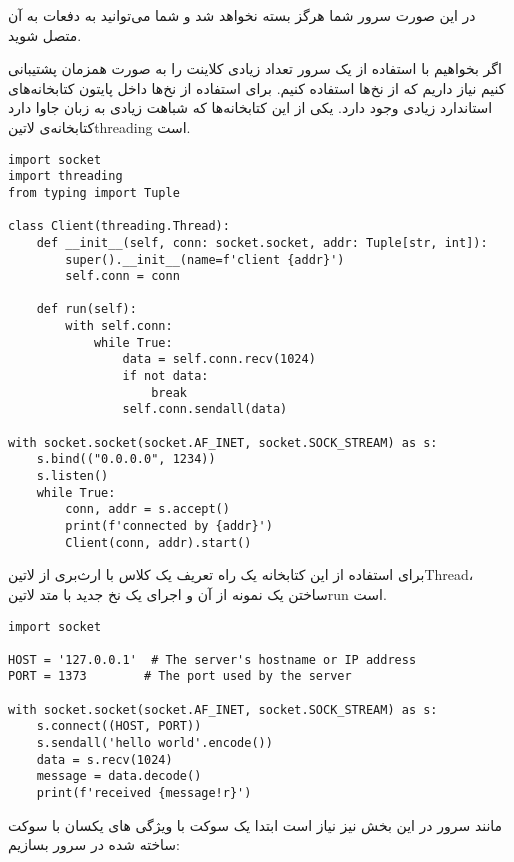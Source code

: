 \documentclass[]{article}
\begin{document}
  در این صورت سرور شما هرگز بسته نخواهد شد و شما می‌توانید به دفعات به آن متصل شوید.


  اگر بخواهیم با استفاده از یک سرور تعداد زیادی کلاینت را به صورت همزمان پشتیبانی کنیم نیاز داریم که از نخ‌ها استفاده کنیم.
  برای استفاده از نخ‌ها داخل پایتون کتابخانه‌های استاندارد زیادی وجود دارد. یکی از این کتابخانه‌ها که شباهت زیادی به زبان جاوا دارد
  کتابخانه‌ی ‌لاتین{threading} است.

  \begin{latin}
  \begin{verbatim}
import socket
import threading
from typing import Tuple

class Client(threading.Thread):
    def __init__(self, conn: socket.socket, addr: Tuple[str, int]):
        super().__init__(name=f'client {addr}')
        self.conn = conn

    def run(self):
        with self.conn:
            while True:
                data = self.conn.recv(1024)
                if not data:
                    break
                self.conn.sendall(data)

with socket.socket(socket.AF_INET, socket.SOCK_STREAM) as s:
    s.bind(("0.0.0.0", 1234))
    s.listen()
    while True:
        conn, addr = s.accept()
        print(f'connected by {addr}')
        Client(conn, addr).start()
  \end{verbatim}
  \end{latin}

  برای استفاده از این کتابخانه یک راه تعریف یک کلاس با ارث‌بری از ‌لاتین{Thread}، ساختن یک نمونه از آن و اجرای یک نخ جدید با متد ‌لاتین{run} است.


  \begin{latin}
  \begin{verbatim}
import socket

HOST = '127.0.0.1'  # The server's hostname or IP address
PORT = 1373        # The port used by the server

with socket.socket(socket.AF_INET, socket.SOCK_STREAM) as s:
    s.connect((HOST, PORT))
    s.sendall('hello world'.encode())
    data = s.recv(1024)
    message = data.decode()
    print(f'received {message!r}')
  \end{verbatim}
  \end{latin}

مانند سرور در این بخش نیز نیاز است ابتدا یک سوکت با ویژگی های یکسان با سوکت ساخته شده در سرور بسازیم:
\end{document}

